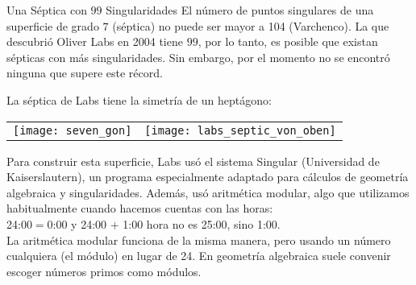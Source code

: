 \begin{surferPage}{Una Séptica con $99$ Singularidades}
    El número de puntos singulares de una superficie de grado $7$ (séptica)
    no puede ser mayor a 104 (Varchenco).
    La que descubrió Oliver Labs en 2004 tiene $99$, por lo tanto, es posible 
    que existan sépticas con más singularidades. Sin embargo, por el momento
    no se encontró ninguna que supere este récord.
    
    La séptica de Labs tiene la simetría de un heptágono:  
    
    \vspace*{-0.3em}
    \begin{center}
      \begin{tabular}{c@{\qquad}c}
        \texttt{[image: seven\_gon]}
        &
        \texttt{[image: labs\_septic\_von\_oben]}
      \end{tabular}
    \end{center}
    \vspace*{-0.3em}
    Para construir esta superficie, Labs usó el sistema 
    {\sc Singular} (Universidad de Kaiserslautern), un programa especialmente adaptado
    para cálculos de geometría algebraica y singularidades. 
    Además, usó aritmética modular, algo que utilizamos habitualmente cuando hacemos cuentas con las horas:\\
    24:00$=$0:00 y 24:00 $+$ 1:00 hora no es 25:00, sino 1:00.\\
    La aritmética modular funciona de la misma manera, pero usando un número cualquiera
    (el módulo) en lugar de 24.
    En geometría algebraica suele convenir escoger números primos como módulos.
\end{surferPage}
